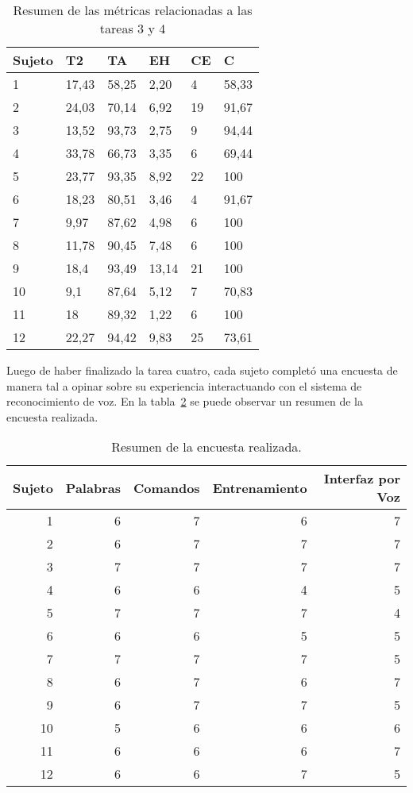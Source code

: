 \begin{table}[H]
\centering
\footnotesize
\begin{tabular}{|p{1.6cm}|p{1.6cm}|p{1.6cm}|p{1.6cm}|p{1.6cm}|p{1.6cm}|}
\hline
    Sujeto & T2 & TA   &  EH  & CE &  C\\
    \hline 
    1  & 17,43 & 58,25 & 2,20  & 4  & 58,33 \\
    2  & 24,03 & 70,14 & 6,92  & 19 & 91,67 \\
    3  & 13,52 & 93,73 & 2,75  & 9  & 94,44 \\
    4  & 33,78 & 66,73 & 3,35  & 6  & 69,44 \\
    5  & 23,77 & 93,35 & 8,92  & 22 & 100   \\
    6  & 18,23 & 80,51 & 3,46  & 4  & 91,67 \\
    7  & 9,97  & 87,62 & 4,98  & 6  & 100   \\
    8  & 11,78 & 90,45 & 7,48  & 6  & 100   \\
    9  & 18,4  & 93,49 & 13,14 & 21 & 100   \\
    10 & 9,1   & 87,64 & 5,12  & 7  & 70,83 \\
    11 & 18    & 89,32 & 1,22  & 6  & 100   \\
    12 & 22,27 & 94,42 & 9,83  & 25 & 73,61 \\
\hline
\end{tabular}
\caption{Resumen de las m\'etricas relacionadas a las tareas 3 y 4}
\label{sec:tabla-metricas-t4}
\end{table}


Luego de haber finalizado la tarea cuatro, cada sujeto complet\'o una encuesta de manera tal a
opinar sobre su experiencia interactuando con el sistema de reconocimiento de voz. En la tabla~\ref{sec:tabla-encuesta}
se puede observar un resumen de la encuesta realizada.


\begin{table}[H] 
\centering
\footnotesize
\begin{tabular}{|r|r|r|r|r|}
\hline
    Sujeto & Palabras & Comandos & Entrenamiento & Interfaz por Voz \\
    \hline
    1 & 6 & 7 & 6 & 7 \\
    2 & 6 & 7 & 7 & 7 \\
    3 & 7 & 7 & 7 & 7 \\
    4 & 6 & 6 & 4 & 5 \\
    5 & 7 & 7 & 7 & 4 \\
    6 & 6 & 6 & 5 & 5 \\
    7 & 7 & 7 & 7 & 5 \\
    8 & 6 & 7 & 6 & 7  \\
    9 & 6 & 7 & 7 & 5  \\
    10 & 5 & 6 & 6 & 6  \\
    11 & 6 & 6 & 6 & 7  \\
    12 & 6 & 6 & 7 & 5  \\
\hline
\end{tabular}
\caption{Resumen de la encuesta realizada.}
\label{sec:tabla-encuesta}
\end{table}

